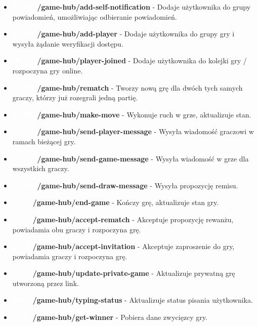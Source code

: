 \documentclass[twoside]{projektInzynierskiMS1}
\begin{document}
\begin{itemize}
    \setlength\itemsep{0cm}
    \item \textbf{\colorbox{green!90}{\textcolor{white}{POST}} /game-hub/add-self-notification} - Dodaje użytkownika do grupy powiadomień, umożliwiając odbieranie powiadomień.
    \item \textbf{\colorbox{green!90}{\textcolor{white}{POST}} /game-hub/add-player} - Dodaje użytkownika do grupy gry i wysyła żądanie weryfikacji dostępu.
    \item \textbf{\colorbox{green!90}{\textcolor{white}{POST}} /game-hub/player-joined} - Dodaje użytkownika do kolejki gry / rozpoczyna gry online.
    \item \textbf{\colorbox{green!90}{\textcolor{white}{POST}} /game-hub/rematch} - Tworzy nową grę dla dwóch tych samych graczy, którzy już rozegrali jedną partię.
    \item \textbf{\colorbox{green!90}{\textcolor{white}{POST}} /game-hub/make-move} - Wykonuje ruch w grze, aktualizuje stan.
    \item \textbf{\colorbox{green!90}{\textcolor{white}{POST}} /game-hub/send-player-message} - Wysyła wiadomość graczowi w ramach bieżącej gry.
    \item \textbf{\colorbox{green!90}{\textcolor{white}{POST}} /game-hub/send-game-message} - Wysyła wiadomość w grze dla wszystkich graczy.
    \item \textbf{\colorbox{green!90}{\textcolor{white}{POST}} /game-hub/send-draw-message} - Wysyła propozycję remisu.
    \item \textbf{\colorbox{orange!90}{\textcolor{white}{PUT}} /game-hub/end-game} - Kończy grę, aktualizuje stan gry.
    \item \textbf{\colorbox{orange!90}{\textcolor{white}{PUT}} /game-hub/accept-rematch} - Akceptuje propozycję rewanżu, powiadamia obu graczy i rozpoczyna grę.
    \item \textbf{\colorbox{orange!90}{\textcolor{white}{PUT}} /game-hub/accept-invitation} - Akceptuje zaproszenie do gry, powiadamia graczy i rozpoczyna grę.
    \item \textbf{\colorbox{orange!90}{\textcolor{white}{PUT}} /game-hub/update-private-game} - Aktualizuje prywatną grę utworzoną przez link.
    \item \textbf{\colorbox{orange!90}{\textcolor{white}{PUT}} /game-hub/typing-status} - Aktualizuje status pisania użytkownika.
    \item \textbf{\colorbox{cyan!90}{\textcolor{white}{GET}} /game-hub/get-winner} - Pobiera dane zwycięzcy gry.

\end{itemize}
\end{document}
